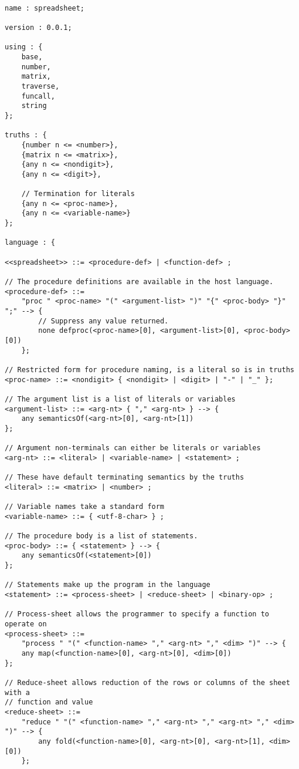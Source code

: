 \begin{verbatim}

name : spreadsheet;

version : 0.0.1;

using : {
    base,
    number,
    matrix,
    traverse,
    funcall,
    string
};

truths : {
    {number n <= <number>},
    {matrix n <= <matrix>},
    {any n <= <nondigit>},
    {any n <= <digit>},

    // Termination for literals
    {any n <= <proc-name>},
    {any n <= <variable-name>}
};

language : {

<<spreadsheet>> ::= <procedure-def> | <function-def> ;

// The procedure definitions are available in the host language. 
<procedure-def> ::= 
    "proc " <proc-name> "(" <argument-list> ")" "{" <proc-body> "}" ";" --> {
        // Suppress any value returned.
        none defproc(<proc-name>[0], <argument-list>[0], <proc-body>[0])
    };

// Restricted form for procedure naming, is a literal so is in truths
<proc-name> ::= <nondigit> { <nondigit> | <digit> | "-" | "_" };

// The argument list is a list of literals or variables
<argument-list> ::= <arg-nt> { "," <arg-nt> } --> {
    any semanticsOf(<arg-nt>[0], <arg-nt>[1])
};

// Argument non-terminals can either be literals or variables
<arg-nt> ::= <literal> | <variable-name> | <statement> ;

// These have default terminating semantics by the truths
<literal> ::= <matrix> | <number> ;

// Variable names take a standard form
<variable-name> ::= { <utf-8-char> } ;

// The procedure body is a list of statements.
<proc-body> ::= { <statement> } --> {
    any semanticsOf(<statement>[0])
};

// Statements make up the program in the language
<statement> ::= <process-sheet> | <reduce-sheet> | <binary-op> ;

// Process-sheet allows the programmer to specify a function to operate on
<process-sheet> ::= 
    "process " "(" <function-name> "," <arg-nt> "," <dim> ")" --> {
    any map(<function-name>[0], <arg-nt>[0], <dim>[0])
};

// Reduce-sheet allows reduction of the rows or columns of the sheet with a 
// function and value
<reduce-sheet> ::= 
    "reduce " "(" <function-name> "," <arg-nt> "," <arg-nt> "," <dim> ")" --> {
        any fold(<function-name>[0], <arg-nt>[0], <arg-nt>[1], <dim>[0])
    };


\end{verbatim}
